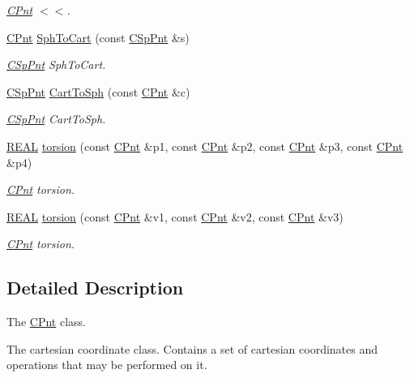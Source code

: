 \begin{DoxyCompactItemize}
\begin{DoxyCompactList}\small\item\em \hyperlink{classCPnt}{C\-Pnt} $<$$<$. \end{DoxyCompactList}\item 
\hyperlink{classCPnt}{C\-Pnt} \hyperlink{classCPnt_af8b263bb80bb3a76271a7f57d5057df3}{Sph\-To\-Cart} (const \hyperlink{classCSpPnt}{C\-Sp\-Pnt} \&s)
\begin{DoxyCompactList}\small\item\em \hyperlink{classCSpPnt}{C\-Sp\-Pnt} Sph\-To\-Cart. \end{DoxyCompactList}\item 
\hyperlink{classCSpPnt}{C\-Sp\-Pnt} \hyperlink{classCPnt_ad05fbf75e7550a927bc817f97115f2fc}{Cart\-To\-Sph} (const \hyperlink{classCPnt}{C\-Pnt} \&c)
\begin{DoxyCompactList}\small\item\em \hyperlink{classCSpPnt}{C\-Sp\-Pnt} Cart\-To\-Sph. \end{DoxyCompactList}\item 
\hyperlink{util_8h_a5821460e95a0800cf9f24c38915cbbde}{R\-E\-A\-L} \hyperlink{classCPnt_ac25278586b4a84caf4098513d812d60b}{torsion} (const \hyperlink{classCPnt}{C\-Pnt} \&p1, const \hyperlink{classCPnt}{C\-Pnt} \&p2, const \hyperlink{classCPnt}{C\-Pnt} \&p3, const \hyperlink{classCPnt}{C\-Pnt} \&p4)
\begin{DoxyCompactList}\small\item\em \hyperlink{classCPnt}{C\-Pnt} torsion. \end{DoxyCompactList}\item 
\hyperlink{util_8h_a5821460e95a0800cf9f24c38915cbbde}{R\-E\-A\-L} \hyperlink{classCPnt_a774fe41d28888a078993d8d3384c34d8}{torsion} (const \hyperlink{classCPnt}{C\-Pnt} \&v1, const \hyperlink{classCPnt}{C\-Pnt} \&v2, const \hyperlink{classCPnt}{C\-Pnt} \&v3)
\begin{DoxyCompactList}\small\item\em \hyperlink{classCPnt}{C\-Pnt} torsion. \end{DoxyCompactList}\end{DoxyCompactItemize}


\subsection{Detailed Description}
The \hyperlink{classCPnt}{C\-Pnt} class. 

The cartesian coordinate class. Contains a set of cartesian coordinates and operations that may be performed on it. 

